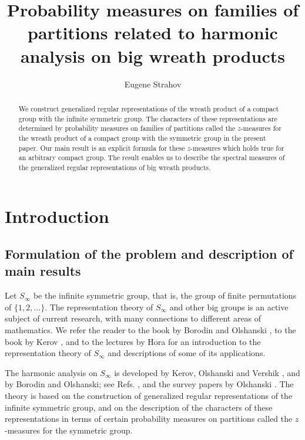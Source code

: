 \documentclass[12pt]{amsart}
\theoremstyle{definition}
\numberwithin{equation}{section}
\begin{document}
\title[Probability measures on families of partitions]
{\bf{Probability measures on families of partitions related to harmonic analysis on big wreath products}}

\author{Eugene Strahov}
\address{Department of Mathematics, The Hebrew University of Jerusalem, Givat Ram, Jerusalem 91904, Israel}
\commby{}
\begin{abstract}
We construct generalized regular representations of the wreath product of a compact group with the infinite symmetric group. The characters of these representations are determined by probability measures on families
of partitions called the $z$-measures for the wreath product of a compact group with the symmetric group in the present paper. Our main result is an explicit formula for these $z$-measures which holds true for an arbitrary compact group. The result enables us to describe the spectral measures of the generalized regular representations of big wreath products.
\end{abstract}
\maketitle
\section{Introduction}
\subsection{Formulation of the problem and description of main results}
Let $S_{\infty}$ be the infinite symmetric group, that is, the group of finite permutations
of $\{1,2,\ldots\}$.
The representation theory of $S_{\infty}$ and other big groups is an active subject of current research, with many connections to different areas of mathematics.
We refer the reader to the book by Borodin and Olshanski \cite{BorodinOlshanskiBook}, to the book by Kerov \cite{KerovDissertation}, and to the lectures by Hora \cite{HoraLectures} for an introduction
to the representation theory of $S_{\infty}$ and descriptions of some of its applications.

The harmonic analysis on $S_{\infty}$ is developed by Kerov, Olshanski and Vershik \cite{KerovOlshanskiVershikAnnouncement, KerovOlshanskiVershik}, and by Borodin and Olshanski;
see Refs. \cite{Borodin1, Borodin2, BorodinOlshanskiLetters}, and the survey papers by Olshanski \cite{OlshanskiPointProcesses, OlshanskiNato}.  The theory is based on the construction
of generalized regular representations of the infinite symmetric group, and on the description
of the characters of these representations in terms of certain probability measures on partitions
called the $z$-measures for the symmetric group.
\end{document}
